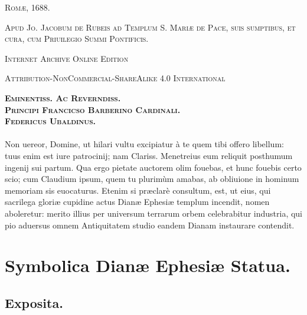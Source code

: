 \documentclass[a4paper, 11pt, oneside, polutonikogreek, latin]{article}
\begin{document}
\begin{titlepage}
\vspace*{\fill}

	\vspace{1\baselineskip}

	{\small\scshape Romæ, 1688.}
	
	{\small\scshape{Apud Jo. Jacobum de Rubeis ad Templum S. Mariæ de Pace, suis sumptibus, et cura, cum Priuilegio Summi Pontificis.}}
	
	\vspace{0.5\baselineskip} %

\scshape Internet Archive Online Edition%
	
	{\scshape\small Attribution-NonCommercial-ShareAlike 4.0 International} %
\end{titlepage}
\setlength{\parskip}{1mm plus1mm minus1mm}
\pagestyle{fancy}
\fancyhf{}
\cfoot{\Fontauri{\thepage}}
\Large
\clearpage
\tableofcontents
\clearpage
\begin{center}
{\scshape\textbf{Eminentiss. Ac Reverndiss.\\Principi Francicso Barberino Cardinali.\\Federicus Ubaldinus.}}
\end{center}
\paragraph{}
Non uereor, Domine, ut hilari vultu excipiatur à te quem tibi offero libellum: tuus enim est iure patrocinij; nam Clariss. Menetreius eum reliquit posthumum ingenij sui partum. Qua ergo pietate auctorem olim fouebas, et hunc fouebis certo scio; cum Claudium ipsum, quem tu plurimùm amabas, ab obliuione in hominum memoriam sis euocaturus. Etenim si præclarè consultum, est, ut eius, qui sacrilega gloriæ cupidine actus Dianæ Ephesiæ templum incendit, nomen aboleretur: merito illius per universum terrarum orbem celebrabitur industria, qui pio aduersus omnem Antiquitatem studio eandem Dianam instaurare contendit.
\clearpage
\section{Symbolica Dianæ Ephesiæ Statua.}
\subsection{Exposita.}
\end{document}
